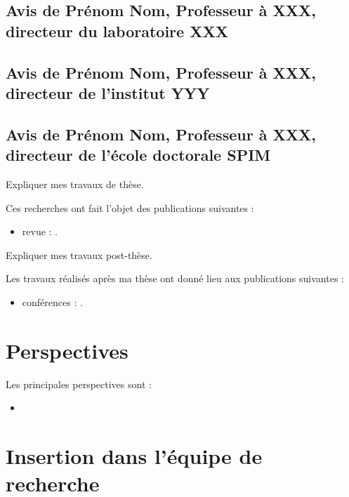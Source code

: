 \documentclass[french]{hdrapplication}
\begin{document}

\subsection{Avis de Prénom Nom, Professeur à XXX, directeur du laboratoire XXX}


\subsection{Avis de Prénom Nom, Professeur à XXX, directeur de l'institut YYY}


\subsection{Avis de Prénom Nom, Professeur à XXX, directeur de l'école doctorale SPIM}


Expliquer mes travaux de thèse.

Ces recherches ont fait l'objet des publications suivantes :
\begin{itemize}
\item revue : .
\end{itemize}



Expliquer mes travaux post-thèse.

Les travaux réalisés après ma thèse ont donné lieu aux publications suivantes :
\begin{itemize}
\item conférences : .
\end{itemize}

\section{Perspectives}

Les principales perspectives sont :
\begin{itemize}
\item 
\end{itemize}

\section{Insertion dans l'équipe de recherche}
\end{document}
